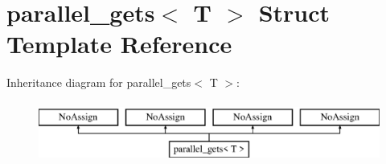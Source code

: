 \hypertarget{structparallel__gets}{}\section{parallel\+\_\+gets$<$ T $>$ Struct Template Reference}
\label{structparallel__gets}
Inheritance diagram for parallel\+\_\+gets$<$ T $>$\+:\begin{figure}[H]
\begin{center}
\leavevmode
\includegraphics[height=2.000000cm]{structparallel__gets}
\end{center}
\end{figure}
